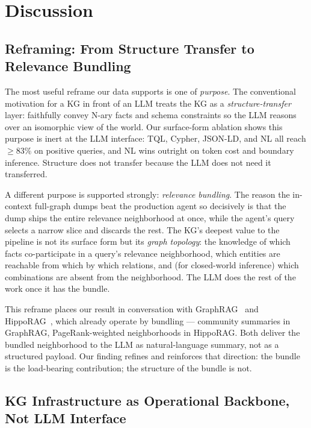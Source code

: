 \section{Discussion}\label{sec:discussion}

\subsection{Reframing: From Structure Transfer to Relevance Bundling}

The most useful reframe our data supports is one of \emph{purpose}.
The conventional motivation for a KG in front of an LLM treats the
KG as a \emph{structure-transfer} layer: faithfully convey N-ary
facts and schema constraints so the LLM reasons over an isomorphic
view of the world. Our surface-form ablation shows this purpose is
inert at the LLM interface: TQL, Cypher, JSON-LD, and NL all reach
$\geq 83\%$ on positive queries, and NL wins outright on token cost
and boundary inference. Structure does not transfer because the LLM
does not need it transferred.

A different purpose is supported strongly: \emph{relevance
bundling}. The reason the in-context full-graph dumps beat the
production agent so decisively is that the dump ships the entire
relevance neighborhood at once, while the agent's query selects a
narrow slice and discards the rest. The KG's deepest value to the
pipeline is not its surface form but its \emph{graph topology}: the
knowledge of which facts co-participate in a query's relevance
neighborhood, which entities are reachable from which by which
relations, and (for closed-world inference) which combinations are
absent from the neighborhood. The LLM does the rest of the work
once it has the bundle.

This reframe places our result in conversation with
GraphRAG~\citep{edge2024graphrag} and
HippoRAG~\citep{gutierrez2024hipporag}, which already operate by
bundling — community summaries in GraphRAG, PageRank-weighted
neighborhoods in HippoRAG. Both deliver the bundled neighborhood to
the LLM as natural-language summary, not as a structured payload.
Our finding refines and reinforces that direction: the bundle is
the load-bearing contribution; the structure of the bundle is not.

\subsection{KG Infrastructure as Operational Backbone, Not LLM Interface}

